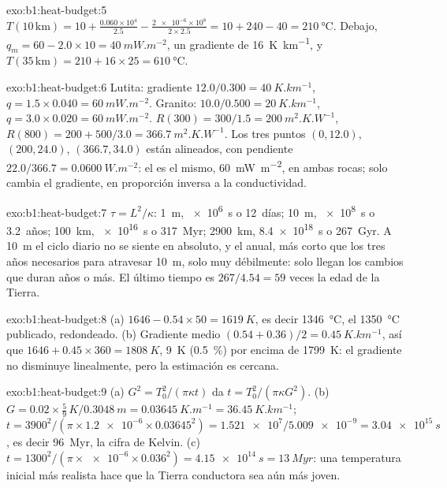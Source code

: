 \begin{solution}{exo:b1:heat-budget:5}
$T(10\,\text{km}) = 10 + \frac{0.060\times10^4}{2.5} - \frac{\num{2e-6}\times10^8}{2\times2.5}
= 10 + 240 - 40 = \qty{210}{\degreeCelsius}$. Debajo, $q_m = 60 - 2.0\times10 =
\qty{40}{mW.m^{-2}}$, un gradiente de \qty{16}{K.km^{-1}}, y
$T(35\,\text{km}) = 210 + 16\times25 = \qty{610}{\degreeCelsius}$.
\end{solution}

\begin{solution}{exo:b1:heat-budget:6}
Lutita: gradiente $12.0/0.300 = \qty{40}{K.km^{-1}}$, $q = 1.5\times0.040 =
\qty{60}{mW.m^{-2}}$. Granito: $10.0/0.500 = \qty{20}{K.km^{-1}}$,
$q = 3.0\times0.020 = \qty{60}{mW.m^{-2}}$. $R(300) = 300/1.5 =
\qty{200}{m^2.K.W^{-1}}$, $R(800) = 200 + 500/3.0 = \qty{366.7}{m^2.K.W^{-1}}$.
Los tres puntos $(0, 12.0)$, $(200, 24.0)$, $(366.7, 34.0)$ están alineados, con
pendiente $22.0/366.7 = \qty{0.0600}{W.m^{-2}}$: el  es el mismo,
\qty{60}{mW.m^{-2}}, en ambas rocas; solo cambia el gradiente, en proporción
inversa a la conductividad.
\end{solution}

\begin{solution}{exo:b1:heat-budget:7}
$\tau = L^2/\kappa$: \qty{1}{m}, \qty{e6}{s} o \num{12}~días; \qty{10}{m},
\qty{e8}{s} o \num{3.2}~años; \qty{100}{km}, \qty{e16}{s} o
\qty{317}{Myr}; \qty{2900}{km}, \qty{8.4e18}{s} o \qty{267}{Gyr}. A
\qty{10}{m} el ciclo diario no se siente en absoluto, y el anual, más corto
que los tres años necesarios para atravesar \qty{10}{m}, solo muy débilmente: solo llegan
los cambios que duran años o más. El último tiempo es $267/4.54 = 59$ veces la
edad de la Tierra.
\end{solution}

\begin{solution}{exo:b1:heat-budget:8}
(a) $1646 - 0.54\times50 = \qty{1619}{K}$, es decir \qty{1346}{\degreeCelsius},
el \qty{1350}{\degreeCelsius} publicado, redondeado. (b) Gradiente medio
$(0.54 + 0.36)/2 = \qty{0.45}{K.km^{-1}}$, así que $1646 + 0.45\times360 =
\qty{1808}{K}$, \qty{9}{K} (\qty{0.5}{\percent}) por encima de \qty{1799}{K}: el
gradiente no disminuye linealmente, pero la estimación es cercana.
\end{solution}

\begin{solution}{exo:b1:heat-budget:9}
(a) $G^2 = T_0^2/(\pi\kappa t)$ da $t = T_0^2/(\pi\kappa G^2)$.
(b) $G = 0.02\times\tfrac59\,\unit{K}/\qty{0.3048}{m} = \qty{0.03645}{K.m^{-1}} =
\qty{36.45}{K.km^{-1}}$; $t = 3900^2/(\pi\times\num{1.2e-6}\times0.03645^2) =
\num{1.521e7}/\num{5.009e-9} = \qty{3.04e15}{s}$, es decir \qty{96}{Myr},
la cifra de Kelvin. (c) $t = 1300^2/(\pi\times\num{e-6}\times0.036^2) =
\qty{4.15e14}{s} = \qty{13}{Myr}$: una temperatura inicial más realista hace
que la Tierra conductora sea aún más joven.
\end{solution}

